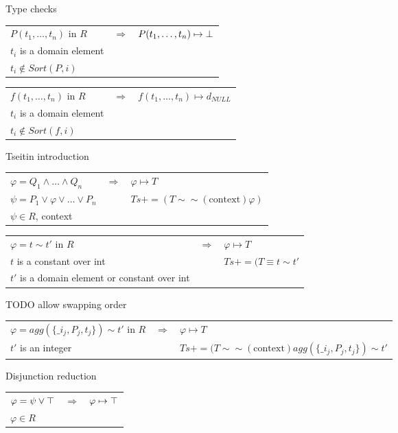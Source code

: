 \documentclass{article}
\begin{document}
\noindent Type checks

\begin{tabular}{|lcl|} \hline
$P(t_1, \ldots, t_n)$ in $R$ & $\Longrightarrow$& $P(t_1, \ldots, t_n)\mapsto \bot$\\
$t_i$ is a domain element && \\
$t_i \not\in Sort(P,i)$ &&\\
\hline
\end{tabular}

\begin{tabular}{|lcl|} \hline
$f(t_1, \ldots, t_n)$ in $R$ & $\Longrightarrow$& $f(t_1, \ldots, t_n)\mapsto d_{NULL}$\\
$t_i$ is a domain element && \\
$t_i \not\in Sort(f,i)$ &&\\
\hline
\end{tabular}

\noindent Tseitin introduction

\begin{tabular}{|lcl|} \hline
$\varphi = Q_1 \land \ldots \land Q_n$ & $\Longrightarrow$& $\varphi\mapsto T$\\
$\psi = P_1 \lor \varphi \lor \ldots \lor P_n $ && $Ts += (T \sim\sim(\text{context}) \varphi)$\\
$\psi \in R$, context &&\\
\hline
\end{tabular}

\begin{tabular}{|lcl|} \hline
$\varphi = t \sim t'$ in $R$ & $\Longrightarrow$& $\varphi\mapsto T$\\
$t$ is a constant over int && $Ts += (T \equiv t \sim t'$\\
$t'$ is a domain element or constant over int&&\\
\hline
\end{tabular}

TODO allow swapping order

\begin{tabular}{|lcl|} \hline
$\varphi = agg(\{\_i_j,P_j,t_j\}) \sim t'$ in $R$ & $\Longrightarrow$& $\varphi\mapsto T$\\
$t'$ is an integer && $Ts += (T \sim\sim(\text{context}) agg(\{\_i_j,P_j,t_j\}) \sim t'$\\
\hline
\end{tabular}

\noindent Disjunction reduction

\begin{tabular}{|lcl|} \hline
$\varphi=\psi \lor \top$ & $\Longrightarrow$ & $\varphi \mapsto \top$ \\
$\varphi \in R$ &&\\
\hline
\end{tabular}
\end{document}
